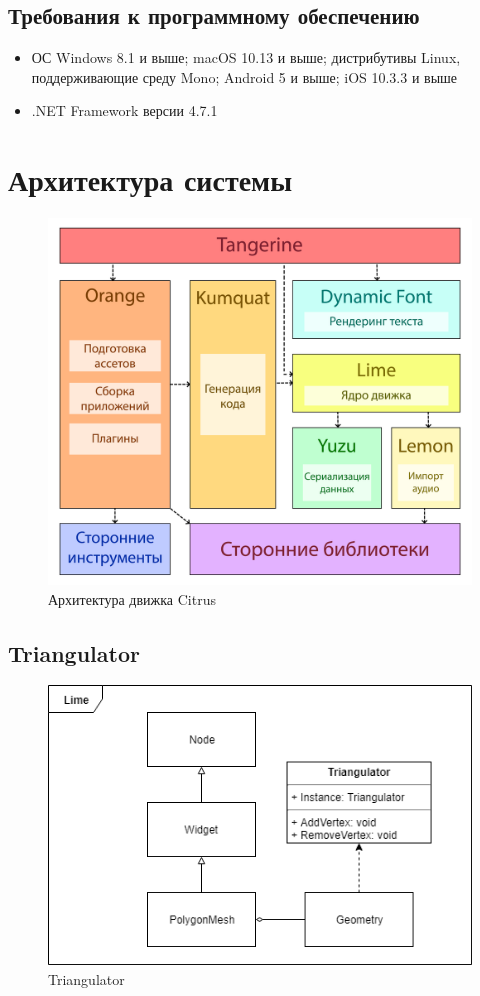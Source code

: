 \documentclass{fefu}
\begin{document}
\subsection{Требования к программному обеспечению}
\begin{itemize}
    \item ОС Windows 8.1 и выше; macOS 10.13 и выше; дистрибутивы
    Linux, поддерживающие среду Mono; Android 5 и выше; iOS 10.3.3 и выше
    \item .NET Framework версии 4.7.1
\end{itemize}
\section{Архитектура системы}
\begin{figure}[H]
    \centering
    \includegraphics[scale=0.25]{images/CitrusArchitecture.png}
    \caption{Архитектура движка Citrus}
    \label{CitrusArchitecture}
\end{figure}
\subsection{Triangulator}
\begin{figure}[H]
    \centering
    \includegraphics{images/TriangulatorArchitecture.png}
    \caption{Triangulator}
    \label{TriangulatorArchitecture}
\end{figure}
\end{document}
